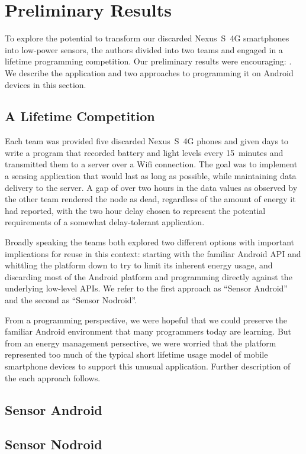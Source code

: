 \section{Preliminary Results}
\label{sec-results}

To explore the potential to transform our discarded Nexus~S~4G smartphones
into low-power sensors, the authors divided into two teams and engaged in a
lifetime programming competition. Our preliminary results were encouraging:
. We describe the application and two approaches to
programming it on Android devices in this section.

\subsection{A Lifetime Competition}

Each team was provided five discarded Nexus~S~4G phones and given
 days to write a program that recorded battery and light
levels every 15~minutes and transmitted them to a server over a Wifi
connection. The goal was to implement a sensing application that would last
as long as possible, while maintaining data delivery to the server. A gap of
over two hours in the data values as observed by the other team rendered the
node as dead, regardless of the amount of energy it had reported, with the
two hour delay chosen to represent the potential requirements of a somewhat
delay-tolerant application.

Broadly speaking the teams both explored two different options with important
implications for reuse in this context: starting with the familiar Android
API and whittling the platform down to try to limit its inherent energy
usage, and discarding most of the Android platform and programming directly
against the underlying low-level APIs. We refer to the first approach as
``Sensor Android'' and the second as ``Sensor Nodroid''.

From a programming perspective, we were hopeful that we could preserve the
familiar Android environment that many programmers today are learning. But
from an energy management persective, we were worried that the platform
represented too much of the typical short lifetime usage model of mobile
smartphone devices to support this unusual application. Further description
of the each approach follows.

\subsection{Sensor Android}


\subsection{Sensor Nodroid}

